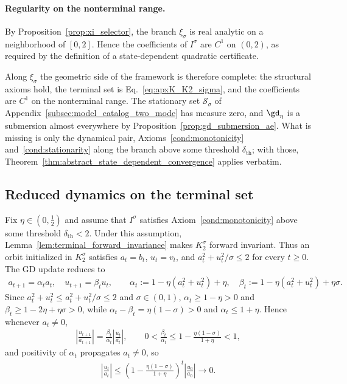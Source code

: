\documentclass{article}
\begin{document}
\paragraph{Regularity on the nonterminal range.}
By Proposition~\ref{prop:xi_selector}, the branch $\xi_\sigma$ is real
analytic on a neighborhood of $[0,2]$. Hence the coefficients of
$I^\sigma$ are $C^1$ on $(0,2)$, as required by the definition of a
state-dependent quadratic certificate.

Along $\xi_\sigma$ the geometric side of the framework is therefore complete:
the structural axioms hold, the terminal set is
Eq.~\eqref{eq:apxK_K2_sigma}, and the coefficients are $C^1$ on the nonterminal
range. The stationary set $\mathcal S_\sigma$ of
Appendix~\ref{subsec:model_catalog_two_mode} has measure zero, and $\gd_\eta$
is a submersion almost everywhere by
Proposition~\ref{prop:gd_submersion_ae}. What is missing is only the dynamical
pair, Axioms~\ref{cond:monotonicity} and~\ref{cond:stationarity} along the
branch above some threshold $\delta_{\mathrm{th}}$; with those,
Theorem~\ref{thm:abstract_state_dependent_convergence} applies verbatim.

\subsection{Reduced dynamics on the terminal set}
\label{subsec:diag1sigma_terminal_dynamics}

Fix $\eta\in(0,\tfrac12)$ and assume that $I^\sigma$ satisfies
Axiom~\ref{cond:monotonicity} above some threshold
$\delta_{\mathrm{th}}<2$. Under this assumption,
Lemma~\ref{lem:terminal_forward_invariance} makes $K_2^\sigma$ forward
invariant. Thus an orbit initialized in $K_2^\sigma$ satisfies $a_t=b_t$,
$u_t=v_t$, and $a_t^2+u_t^2/\sigma\le2$ for every $t\ge0$. The GD update
reduces to
\begin{align}
    a_{t+1}=\alpha_t a_t,\quad u_{t+1}=\beta_t u_t,
    \qquad
    \alpha_t:=1-\eta(a_t^2+u_t^2)+\eta,\quad
    \beta_t:=1-\eta(a_t^2+u_t^2)+\eta\sigma.
\end{align}
Since $a_t^2+u_t^2\le a_t^2+u_t^2/\sigma\le2$ and $\sigma\in(0,1)$,
$\alpha_t\ge1-\eta>0$ and $\beta_t\ge1-2\eta+\eta\sigma>0$, while
$\alpha_t-\beta_t=\eta(1-\sigma)>0$ and $\alpha_t\le1+\eta$. Hence whenever
$a_t\ne0$,
\begin{align}
    \left|\frac{u_{t+1}}{a_{t+1}}\right|
    =
    \frac{\beta_t}{\alpha_t}\left|\frac{u_t}{a_t}\right|,
    \qquad
    0<\frac{\beta_t}{\alpha_t}
    \le
    1-\frac{\eta(1-\sigma)}{1+\eta}<1,
\end{align}
and positivity of $\alpha_t$ propagates $a_t\ne0$, so
\begin{align}
    \left|\frac{u_t}{a_t}\right|
    \le
    \left(1-\frac{\eta(1-\sigma)}{1+\eta}\right)^t
    \left|\frac{u_0}{a_0}\right|
    \longrightarrow0.
\end{align}
\end{document}

